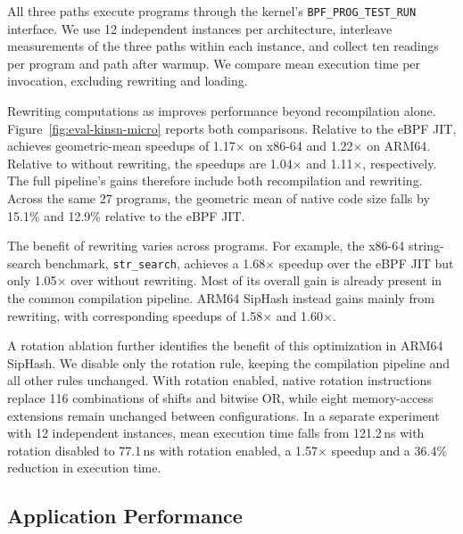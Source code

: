 All three paths execute programs through the kernel's \texttt{BPF\_PROG\_TEST\_RUN} interface. We use 12 independent instances per architecture, interleave measurements of the three paths within each instance, and collect ten readings per program and path after warmup. We compare mean execution time per invocation, excluding rewriting and loading.



Rewriting computations as \kinsns improves performance beyond recompilation alone. Figure~\ref{fig:eval-kinsn-micro} reports both comparisons. Relative to the eBPF JIT, \tool achieves geometric-mean speedups of 1.17$\times$ on x86-64 and 1.22$\times$ on ARM64. Relative to \tool without \kinsn rewriting, the speedups are 1.04$\times$ and 1.11$\times$, respectively. The full pipeline's gains therefore include both recompilation and \kinsn rewriting. Across the same 27 programs, the geometric mean of native code size falls by 15.1\% and 12.9\% relative to the eBPF JIT.

The benefit of \kinsn rewriting varies across programs. For example, the x86-64 string-search benchmark, \texttt{str\_search}, achieves a 1.68$\times$ speedup over the eBPF JIT but only 1.05$\times$ over \tool without \kinsn rewriting. Most of its overall gain is already present in the common compilation pipeline. ARM64 SipHash instead gains mainly from \kinsn rewriting, with corresponding speedups of 1.58$\times$ and 1.60$\times$.

A rotation ablation further identifies the benefit of this optimization in ARM64 SipHash. We disable only the rotation rule, keeping the compilation pipeline and all other rules unchanged. With rotation enabled, native rotation instructions replace 116 combinations of shifts and bitwise OR, while eight memory-access extensions remain unchanged between configurations. In a separate experiment with 12 independent instances, mean execution time falls from 121.2\,ns with rotation disabled to 77.1\,ns with rotation enabled, a 1.57$\times$ speedup and a 36.4\% reduction in execution time.

\subsection{Application Performance}
\label{subsec:corpus_application}





